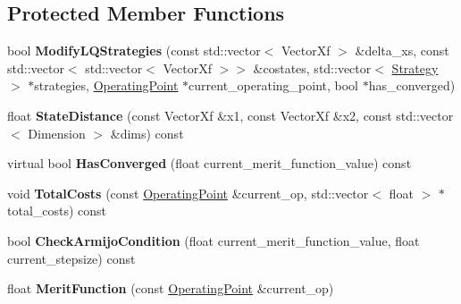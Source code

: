 \subsection*{Protected Member Functions}
\begin{DoxyCompactItemize}
\item 
bool {\bfseries Modify\+L\+Q\+Strategies} (const std\+::vector$<$ Vector\+Xf $>$ \&delta\+\_\+xs, const std\+::vector$<$ std\+::vector$<$ Vector\+Xf $>$$>$ \&costates, std\+::vector$<$ \hyperlink{structilqgames_1_1_strategy}{Strategy} $>$ $\ast$strategies, \hyperlink{structilqgames_1_1_operating_point}{Operating\+Point} $\ast$current\+\_\+operating\+\_\+point, bool $\ast$has\+\_\+converged)\hypertarget{classilqgames_1_1_i_l_q_solver_a165c731a7ef832bd988972414fc071b4}{}\label{classilqgames_1_1_i_l_q_solver_a165c731a7ef832bd988972414fc071b4}

\item 
float {\bfseries State\+Distance} (const Vector\+Xf \&x1, const Vector\+Xf \&x2, const std\+::vector$<$ Dimension $>$ \&dims) const \hypertarget{classilqgames_1_1_i_l_q_solver_aee7f2cfccde0664200d62f92ed5e0606}{}\label{classilqgames_1_1_i_l_q_solver_aee7f2cfccde0664200d62f92ed5e0606}

\item 
virtual bool {\bfseries Has\+Converged} (float current\+\_\+merit\+\_\+function\+\_\+value) const \hypertarget{classilqgames_1_1_i_l_q_solver_a3a179c3f6bb207a0e9c7f995649d4e7d}{}\label{classilqgames_1_1_i_l_q_solver_a3a179c3f6bb207a0e9c7f995649d4e7d}

\item 
void {\bfseries Total\+Costs} (const \hyperlink{structilqgames_1_1_operating_point}{Operating\+Point} \&current\+\_\+op, std\+::vector$<$ float $>$ $\ast$total\+\_\+costs) const \hypertarget{classilqgames_1_1_i_l_q_solver_acf0f45f07d5484a9a60b3a2e1db1647a}{}\label{classilqgames_1_1_i_l_q_solver_acf0f45f07d5484a9a60b3a2e1db1647a}

\item 
bool {\bfseries Check\+Armijo\+Condition} (float current\+\_\+merit\+\_\+function\+\_\+value, float current\+\_\+stepsize) const \hypertarget{classilqgames_1_1_i_l_q_solver_a588b7fa207a616ccb30cde5d41ddad6b}{}\label{classilqgames_1_1_i_l_q_solver_a588b7fa207a616ccb30cde5d41ddad6b}

\item 
float {\bfseries Merit\+Function} (const \hyperlink{structilqgames_1_1_operating_point}{Operating\+Point} \&current\+\_\+op)\hypertarget{classilqgames_1_1_i_l_q_solver_af7c6030e72d5d886f55dbf5792206016}{}\label{classilqgames_1_1_i_l_q_solver_af7c6030e72d5d886f55dbf5792206016}


\end{DoxyCompactItemize}
